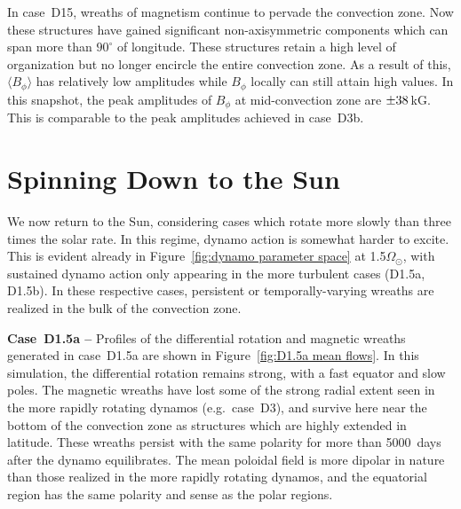 In case~D15, wreaths of magnetism continue to pervade the convection
zone.  Now these structures have gained significant non-axisymmetric
components which can span more than $90^\circ$ of longitude.  These
structures retain a high level of organization but no longer encircle
the entire convection zone.  As a result of this,
$\langle B_\phi \rangle$ has relatively low amplitudes while
$B_\phi$ locally can still attain high values.  In this
snapshot, the peak amplitudes of $B_\phi$ at mid-convection zone are
$\pm38\thinspace$kG. This is comparable to the peak amplitudes
achieved in case~D3b. 

\section{Spinning Down to the Sun}
We now return to the Sun, considering cases which rotate more slowly
than three times the solar rate.  In this regime, dynamo action is
somewhat harder to excite.  This is evident already in
Figure~\ref{fig:dynamo parameter space} at
1.5\thinspace$\Omega_\odot$, with sustained dynamo action only
appearing in the more turbulent cases (D1.5a, D1.5b).  In these
respective cases, persistent or temporally-varying wreaths are
realized in the bulk of the convection zone.  

\clearpage
\textbf{Case~D1.5a --} Profiles of the differential rotation and
magnetic wreaths generated in case~D1.5a are shown in
Figure~\ref{fig:D1.5a mean flows}.  In this simulation, the
differential rotation remains strong, with a fast equator and slow
poles.  The magnetic wreaths have lost
some of the strong radial extent seen in the more rapidly rotating
dynamos (e.g.~case~D3), and survive here near the bottom of the
convection zone as structures which are highly extended in latitude.
These wreaths persist with the same polarity for more than 5000~days
after the dynamo equilibrates.  The mean poloidal field is more
dipolar in nature than those realized in the more rapidly rotating
dynamos, and the equatorial region has the same polarity and
sense as the polar regions. 


